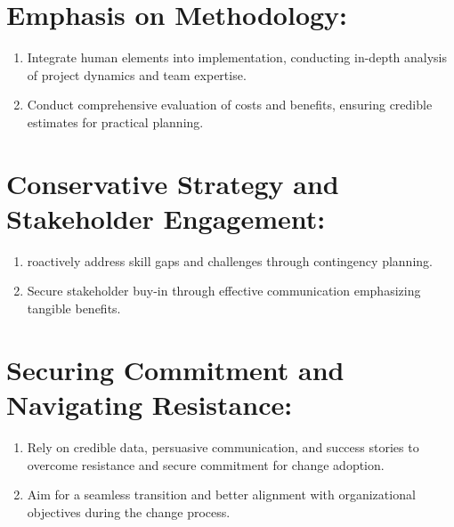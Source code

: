 \documentclass[11pt,letterpaper]{report}
\begin{document}
\section{Emphasis on Methodology:}
\begin{enumerate}
\item Integrate human elements into implementation, conducting in-depth analysis of project dynamics and team expertise.
\item Conduct comprehensive evaluation of costs and benefits, ensuring credible estimates for practical planning.
\end{enumerate}

\section{Conservative Strategy and Stakeholder Engagement:}
\begin{enumerate}
\item roactively address skill gaps and challenges through contingency planning.
\item Secure stakeholder buy-in through effective communication emphasizing tangible benefits.
\end{enumerate}

\section{Securing Commitment and Navigating Resistance:}
\begin{enumerate}
\item Rely on credible data, persuasive communication, and success stories to overcome resistance and secure commitment for change adoption.
\item Aim for a seamless transition and better alignment with organizational objectives during the change process.
\end{enumerate}
\end{document}
